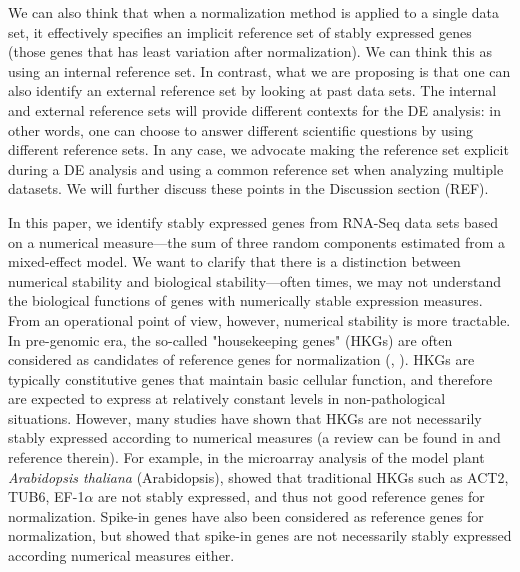 \documentclass[11pt, a4paper]{article}
\begin{document}
We can also think that when a normalization method is applied to a single data
set, it effectively specifies an implicit reference set of stably expressed
genes (those genes that has least variation after normalization). We can think
this as using an internal reference set. In contrast, what we are proposing is
that one can also identify an external reference set by looking at past data
sets. The internal and external reference sets will provide different contexts
for the DE analysis: in other words, one can choose to answer different
scientific questions by using different reference sets. In any case, we
advocate  making the reference set explicit during a DE analysis and using a
common reference set when analyzing multiple datasets. We will further discuss
these points in the Discussion section (REF).


In this paper, we identify stably expressed genes from RNA-Seq data sets based
on a numerical measure---the sum of three random components estimated from a
mixed-effect model.  We want to clarify that there is a distinction between
numerical stability and biological stability---often times, we may not
understand the biological functions of genes with numerically stable
expression measures.  From an operational point of view, however, numerical
stability is more tractable.  In pre-genomic era, the so-called "housekeeping
genes" (HKGs) are often considered as candidates of reference genes for
normalization (\cite{bustin2002quantification},
\cite{andersen2004normalization}). HKGs are typically constitutive genes that
maintain basic cellular function, and therefore are expected to express at
relatively constant levels in non-pathological situations.  However, many
studies have shown that HKGs are not necessarily stably expressed according to
numerical measures (a review can be found in \cite{huggett2005real} and
reference therein).  For example, in the microarray analysis of the model
plant \textit{Arabidopsis thaliana} (Arabidopsis), \cite{czechowski2005genome}
showed that traditional HKGs such as ACT2, TUB6, EF-1$\alpha$ are not stably
expressed, and thus not good reference genes for normalization.  Spike-in
genes have also been considered as reference genes for normalization, but
\cite{risso2014nat} showed that spike-in genes are not necessarily stably
expressed according numerical measures either.  
\end{document}
